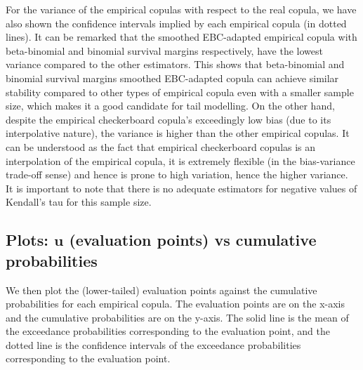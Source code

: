 \documentclass[12pt]{report}
\newcommand{\1}{\mathbf{1}}
\begin{document}
\begin{flushleft}
\vspace{0.5cm}
For the variance of the empirical copulas with respect to the real copula, we have also shown the confidence intervals implied by each empirical copula (in dotted lines). It can be remarked that the smoothed EBC-adapted empirical copula with beta-binomial and binomial survival margins respectively, have the lowest variance compared to the other estimators. This shows that beta-binomial and binomial survival margins smoothed EBC-adapted copula can achieve similar stability compared to other types of empirical copula even with a smaller sample size, which makes it a good candidate for tail modelling. On the other hand, despite the empirical checkerboard copula's exceedingly low bias (due to its interpolative nature), the variance is higher than the other empirical copulas. It can be understood as the fact that empirical checkerboard copulas is an interpolation of the empirical copula, it is extremely flexible (in the bias-variance trade-off sense) and hence is prone to high variation, hence the higher variance.\\
\vspace{0.5cm}
It is important to note that there is no adequate estimators for negative values of Kendall's tau for this sample size. \\

\newpage
\subsection{Plots: $\textbf{u}$ (evaluation points) vs cumulative probabilities}
\vspace{0.5cm}
We then plot the (lower-tailed) evaluation points against the cumulative probabilities for each empirical copula. The evaluation points are on the x-axis and the cumulative probabilities are on the y-axis. The solid line is the mean of the exceedance probabilities corresponding to the evaluation point, and the dotted line is the confidence intervals of the exceedance probabilities corresponding to the evaluation point.


\end{flushleft}
\end{document}
